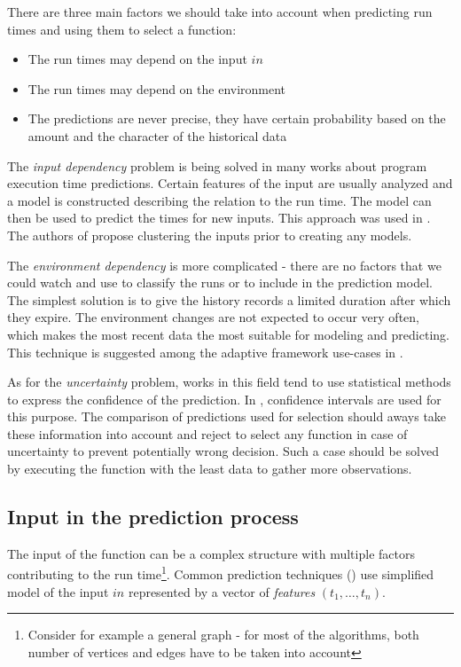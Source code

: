 There are three main factors we should take into account when predicting run times and using them to select a function:

\begin{itemize}
	\item The run times may depend on the input $in$
	\item The run times may depend on the environment
	\item The predictions are never precise, they have certain probability based on the amount and the character of the historical data
\end{itemize}

The \textit{input dependency} problem is being solved in many works about program execution time predictions. Certain features of the input are usually analyzed and a model is constructed describing the relation to the run time. The model can then be used to predict the times for new inputs. This approach was used in \cite{chun_mantis:_2010,goldsmith_measuring_2007}. The authors of \cite{smith_predicting_1998} propose clustering the inputs prior to creating any models.

The \textit{environment dependency} is more complicated - there are no factors that we could watch and use to classify the runs or to include in the prediction model. The simplest solution is to give the history records a limited duration after which they expire. The environment changes are not expected to occur very often, which makes the most recent data the most suitable for modeling and predicting. This technique is suggested among the adaptive framework use-cases in \cite{bulej_performance_2012}.

As for the \textit{uncertainty} problem, works in this field tend to use statistical methods to express the confidence of the prediction. In \cite{smith_predicting_1998}, confidence intervals are used for this purpose. The comparison of predictions used for selection should aways take these information into account and reject to select any function in case of uncertainty to prevent potentially wrong decision. Such a case should be solved by executing the function with the least data to gather more observations.

\subsection{Input in the prediction process}
\label{subsec:input_in_selection}

The input of the function can be a complex structure with multiple factors contributing to the run time\footnote{Consider for example a general graph - for most of the algorithms, both number of vertices and edges have to be taken into account}. Common prediction techniques (\cite{chun_mantis:_2010,goldsmith_measuring_2007}) use simplified model of the input $in$ represented by a vector of \textit{features} $(t_1, \dots, t_n)$. 


